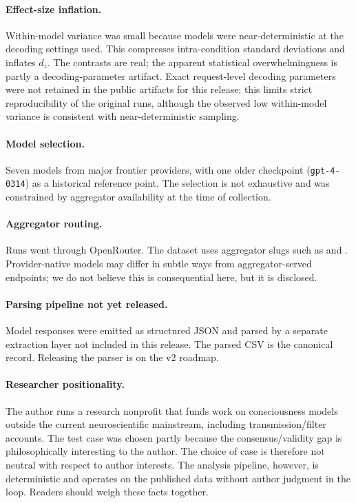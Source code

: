 \documentclass[11pt,letterpaper]{article}
\begin{document}
\paragraph{Effect-size inflation.} Within-model variance was small because models were near-deterministic at the decoding settings used. This compresses intra-condition standard deviations and inflates $d_z$. The contrasts are real; the apparent statistical overwhelmingness is partly a decoding-parameter artifact. Exact request-level decoding parameters were not retained in the public artifacts for this release; this limits strict reproducibility of the original runs, although the observed low within-model variance is consistent with near-deterministic sampling.

\paragraph{Model selection.} Seven models from major frontier providers, with one older checkpoint (\texttt{gpt-4-0314}) as a historical reference point. The selection is not exhaustive and was constrained by aggregator availability at the time of collection.

\paragraph{Aggregator routing.} Runs went through OpenRouter. The dataset uses aggregator slugs such as  and . Provider-native models may differ in subtle ways from aggregator-served endpoints; we do not believe this is consequential here, but it is disclosed.

\paragraph{Parsing pipeline not yet released.} Model responses were emitted as structured JSON and parsed by a separate extraction layer not included in this release. The parsed CSV is the canonical record. Releasing the parser is on the v2 roadmap.

\paragraph{Researcher positionality.} The author runs a research nonprofit that funds work on consciousness models outside the current neuroscientific mainstream, including transmission/filter accounts. The test case was chosen partly because the consensus/validity gap is philosophically interesting to the author. The choice of case is therefore not neutral with respect to author interests. The analysis pipeline, however, is deterministic and operates on the published data without author judgment in the loop. Readers should weigh these facts together.
\end{document}
